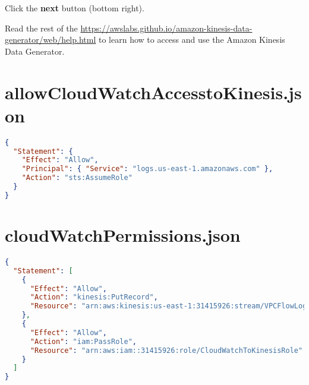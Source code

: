 Click the \textbf{next} button (bottom right).

Read the rest of the \scriptsize{\url{https://awslabs.github.io/amazon-kinesis-data-generator/web/help.html}} to learn how to access and use the Amazon Kinesis Data Generator.

\section{allowCloudWatchAccesstoKinesis.json}
\begin{lstlisting}[language=json]
{
  "Statement": {
    "Effect": "Allow",
    "Principal": { "Service": "logs.us-east-1.amazonaws.com" },
    "Action": "sts:AssumeRole"
  }
}
\end{lstlisting}

\section{cloudWatchPermissions.json}
\begin{lstlisting}[language=json]
{
  "Statement": [
    {
      "Effect": "Allow",
      "Action": "kinesis:PutRecord",
      "Resource": "arn:aws:kinesis:us-east-1:31415926:stream/VPCFlowLogs"
    },
    {
      "Effect": "Allow",
      "Action": "iam:PassRole",
      "Resource": "arn:aws:iam::31415926:role/CloudWatchToKinesisRole"
    }
  ]
}
\end{lstlisting}

